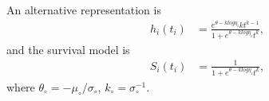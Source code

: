 
An alternative representation is 
\begin{equation}
    \begin{split}
        h_i(t_i) &= \frac{e^{\theta - k log\eta_i}  kt^{k-1}}{1+e^{\theta - k log\eta_i}t^k},
    \end{split}
\end{equation}
and the survival model is
\begin{equation}
    \begin{split}
        S_i(t_i) &= \frac{1}{1+e^{\theta - k log\eta_i}t^k},
    \end{split}
\end{equation}
where $\theta_{\circ} = -\mu_{\circ}/\sigma_{\circ}$, $k_{\circ} = \sigma_{\circ}^{-1}$.